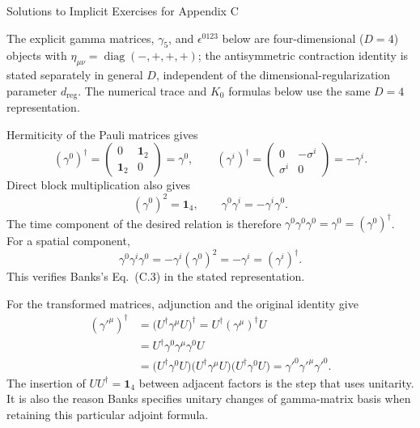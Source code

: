 \begin{bankssolutions}{Solutions to Implicit Exercises for Appendix C}

The explicit gamma matrices, $\gamma_5$, and $\epsilon^{0123}$ below are
four-dimensional ($D=4$) objects with
$\eta_{\mu\nu}=\operatorname{diag}(-,+,+,+)$; the antisymmetric contraction
identity is stated separately in general $D$, independent of the
dimensional-regularization parameter $d_{\mathrm{reg}}$.  The numerical trace
and $K_0$ formulas below use the same $D=4$ representation.

Hermiticity of the Pauli matrices gives
\[
 (\gamma^0)^\dagger
 =\begin{pmatrix}0&\mathbf 1_2\\ \mathbf 1_2&0\end{pmatrix}
 =\gamma^0,
 \qquad
 (\gamma^i)^\dagger
 =\begin{pmatrix}0&-\sigma^i\\ \sigma^i&0\end{pmatrix}
 =-\gamma^i.
\]
Direct block multiplication also gives
\[
 (\gamma^0)^2=\mathbf 1_4,
 \qquad
 \gamma^0\gamma^i=-\gamma^i\gamma^0.
\]
The time component of the desired relation is therefore
$\gamma^0\gamma^0\gamma^0=\gamma^0=(\gamma^0)^\dagger$.  For a spatial
component,
\[
 \gamma^0\gamma^i\gamma^0
 =-\gamma^i(\gamma^0)^2
 =-\gamma^i
 =(\gamma^i)^\dagger.
\]
This verifies Banks's Eq.~(C.3) in the stated representation.

For the transformed matrices, adjunction and the original identity give
\begin{align*}
 (\gamma'^\mu)^\dagger
 &=\bigl(U^\dagger\gamma^\mu U\bigr)^\dagger
   =U^\dagger(\gamma^\mu)^\dagger U\\
 &=U^\dagger\gamma^0\gamma^\mu\gamma^0U\\
 &=\bigl(U^\dagger\gamma^0U\bigr)
   \bigl(U^\dagger\gamma^\mu U\bigr)
   \bigl(U^\dagger\gamma^0U\bigr)
   =\gamma'^0\gamma'^\mu\gamma'^0.
\end{align*}
The insertion of $UU^\dagger=\mathbf 1_4$ between adjacent factors is the
step that uses unitarity.  It is also the reason Banks specifies unitary
changes of gamma-matrix basis when retaining this particular adjoint
formula.


\end{bankssolutions}
